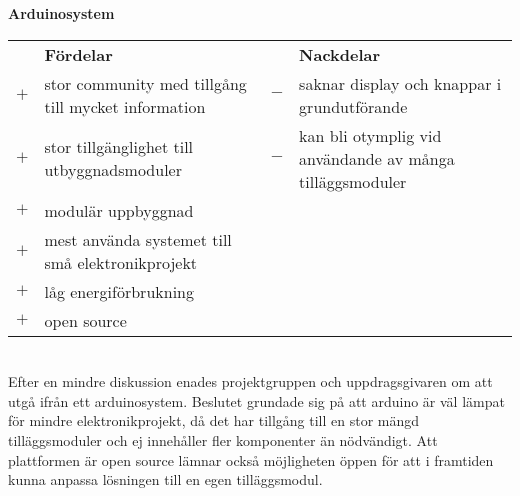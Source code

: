 \documentclass[a4paper]{article}
\begin{document}
		\noindent\textsf{\textbf{Arduinosystem}}\\
		\begin{tabularx}{\textwidth}{@{}cXcX}
			& \textbf{Fördelar} 	& & \textbf{Nackdelar} \\
			$+$ & stor community med tillgång till mycket information & $-$ & saknar display och knappar i grundutförande \\
			$+$ & stor tillgänglighet till utbyggnadsmoduler & $-$ & kan bli otymplig vid användande av många tilläggsmoduler \\
			$+$ & modulär uppbyggnad \\
			$+$ & mest använda systemet till små elektronikprojekt \\
			$+$ & låg energiförbrukning \\
			$+$ & open source \\
		\end{tabularx} \\

		\vspace{2mm}\noindent Efter en mindre diskussion enades projektgruppen och uppdragsgivaren om att utgå ifrån ett arduinosystem. Beslutet grundade sig på att arduino är väl lämpat för mindre elektronikprojekt, då det har tillgång till en stor mängd tilläggsmoduler och ej innehåller fler komponenter än nödvändigt. Att plattformen är open source lämnar också möjligheten öppen för att i framtiden kunna anpassa lösningen till en egen tilläggsmodul.
\end{document}
